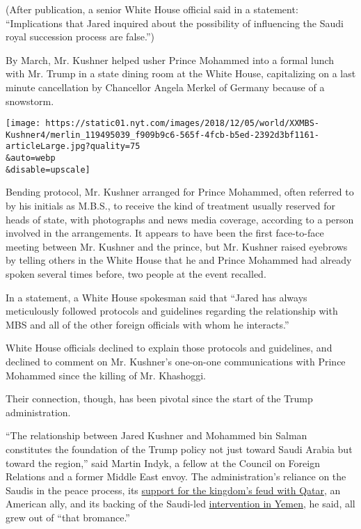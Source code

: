 (After publication, a senior White House official said in a statement:
``Implications that Jared inquired about the possibility of influencing
the Saudi royal succession process are false.'')

By March, Mr. Kushner helped usher Prince Mohammed into a formal lunch
with Mr. Trump in a state dining room at the White House, capitalizing
on a last minute cancellation by Chancellor Angela Merkel of Germany
because of a snowstorm.

\texttt{[image: https://static01.nyt.com/images/2018/12/05/world/XXMBS-Kushner4/merlin\_119495039\_f909b9c6-565f-4fcb-b5ed-2392d3bf1161-articleLarge.jpg?quality=75\\\&auto=webp\\\&disable=upscale]}

Bending protocol, Mr. Kushner arranged for Prince Mohammed, often
referred to by his initials as M.B.S., to receive the kind of treatment
usually reserved for heads of state, with photographs and news media
coverage, according to a person involved in the arrangements. It appears
to have been the first face-to-face meeting between Mr. Kushner and the
prince, but Mr. Kushner raised eyebrows by telling others in the White
House that he and Prince Mohammed had already spoken several times
before, two people at the event recalled.

In a statement, a White House spokesman said that ``Jared has always
meticulously followed protocols and guidelines regarding the
relationship with MBS and all of the other foreign officials with whom
he interacts.''

White House officials declined to explain those protocols and
guidelines, and declined to comment on Mr. Kushner's one-on-one
communications with Prince Mohammed since the killing of Mr. Khashoggi.

Their connection, though, has been pivotal since the start of the Trump
administration.

``The relationship between Jared Kushner and Mohammed bin Salman
constitutes the foundation of the Trump policy not just toward Saudi
Arabia but toward the region,'' said Martin Indyk, a fellow at the
Council on Foreign Relations and a former Middle East envoy. The
administration's reliance on the Saudis in the peace process, its
\href{https://www.nytimes.com/2017/06/06/world/middleeast/trump-qatar-saudi-arabia.html}{support
for the kingdom's feud with Qatar}, an American ally, and its backing of
the Saudi-led
\href{https://www.nytimes.com/interactive/2018/10/26/world/middleeast/saudi-arabia-war-yemen.html}{intervention
in Yemen}, he said, all grew out of ``that bromance.''


